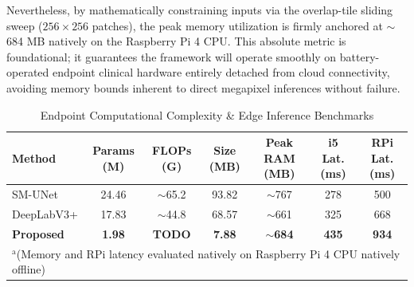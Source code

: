 Nevertheless, by mathematically constraining inputs via the overlap-tile sliding sweep (\(256 \times 256\) patches), the peak memory utilization is firmly anchored at $\sim$684 MB natively on the Raspberry Pi 4 CPU. This absolute metric is foundational; it guarantees the framework will operate smoothly on battery-operated endpoint clinical hardware entirely detached from cloud connectivity, avoiding memory bounds inherent to direct megapixel inferences without failure. 

\begin{table}[htbp]
\caption{Endpoint Computational Complexity & Edge Inference Benchmarks}
\begin{center}
\begin{tabular}{l c c c c c c}
\toprule
\textbf{Method} & \textbf{Params (M)} & \textbf{FLOPs (G)} & \textbf{Size (MB)} & \textbf{Peak RAM (MB)} & \textbf{i5 Lat. (ms)} & \textbf{RPi Lat. (ms)} \\
\midrule
SM-UNet & 24.46 & $\sim$65.2 & 93.82 & $\sim$767 & 278 & 500 \\
DeepLabV3+ \cite{deeplabv3_2018} & 17.83 & $\sim$44.8 & 68.57 & $\sim$661 & 325 & 668 \\
\textbf{Proposed} & \textbf{1.98} & \textbf{TODO} & \textbf{7.88} & \textbf{$\sim$684} & \textbf{435} & \textbf{934} \\
\bottomrule
\multicolumn{7}{l}{$^{\mathrm{a}}$(Memory and RPi latency evaluated natively on Raspberry Pi 4 CPU natively offline)}
\end{tabular}
\label{tab:computation}
\end{center}
\end{table}
